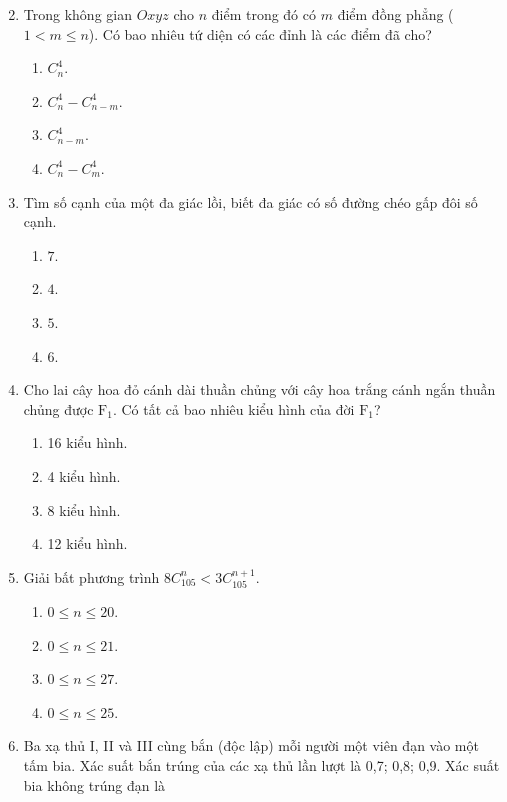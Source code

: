\begin{enumerate}[label=\textbf{Câu \arabic*.},align=left,left=0cm..0cm,itemindent=*]
\begin{multicols}{4}
\begin{enumerate}[label=\textbf{\Alph*.},align=left,left=1cm..0cm,itemindent=*]
	\end{enumerate}\end{multicols}
	\item Trong không gian $Oxyz$ cho $n$ điểm trong đó có $m$ điểm đồng phẳng ($1<m\leqslant n$). Có bao nhiêu tứ diện có các đỉnh là các điểm đã cho?
	\begin{enumerate}[label=\textbf{\Alph*.},align=left,left=1cm..0cm,itemindent=*]
		\item $C_{n}^{4}$.
		\item $C_{n}^{4}-C_{n-m}^{4}$.
		\item $C_{n-m}^{4}$.
		\item $C_{n}^{4}-C_{m}^{4}$.
	\end{enumerate}
	\item Tìm số cạnh của một đa giác lồi, biết đa giác có số đường chéo gấp đôi số cạnh.
	\begin{multicols}{4}\begin{enumerate}[label=\textbf{\Alph*.},align=left,left=1cm..0cm,itemindent=*]
		\item $7$. \item $4$. \item $5$. \item $6$.
	\end{enumerate}\end{multicols}
	\item Cho lai cây hoa đỏ cánh dài thuần chủng với cây hoa trắng cánh ngắn thuần chủng được $\text{F}_1$. Có tất cả bao nhiêu kiểu hình của đời $\text{F}_1$?
	\begin{enumerate}[label=\textbf{\Alph*.},align=left,left=1cm..0cm,itemindent=*]
		\item 16 kiểu hình. \item 4 kiểu hình. \item 8 kiểu hình. \item 12 kiểu hình.
	\end{enumerate}
	\item Giải bất phương trình $8C_{105}^{n}<3C_{105}^{n+1}$.
	\begin{enumerate}[label=\textbf{\Alph*.},align=left,left=1cm..0cm,itemindent=*]
		\item $0\leqslant n\leqslant 20$.
		\item $0\leqslant n\leqslant 21$.
		\item $0\leqslant n\leqslant 27$.
		\item $0\leqslant n\leqslant 25$.
	\end{enumerate}
	\item Ba xạ thủ I, II và III cùng bắn (độc lập) mỗi người một viên đạn vào một tấm bia. Xác suất bắn trúng của các xạ thủ lần lượt là 0,7; 0,8; 0,9. Xác suất bia không trúng đạn là

\end{enumerate}
